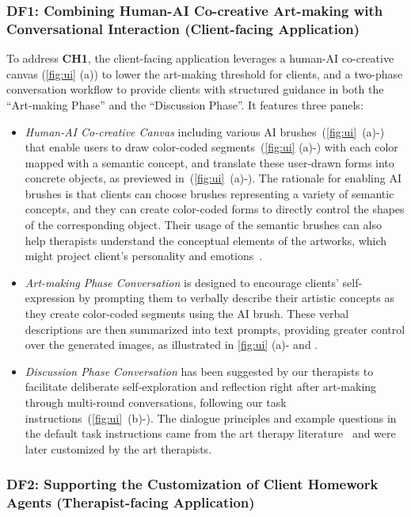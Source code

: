 \subsubsection{\textbf{DF1}: Combining Human-AI Co-creative Art-making with Conversational Interaction (Client-facing Application)}
To address \textbf{CH1}, the client-facing application leverages a human-AI co-creative canvas (\autoref{fig:ui} (a)) to lower the art-making threshold for clients, and a two-phase conversation workflow to provide clients with structured guidance in both the ``Art-making Phase'' and the ``Discussion Phase''. It features three panels: 
\begin{itemize}
    \item \textit{Human-AI Co-creative Canvas} including various AI brushes~(\autoref{fig:ui}~(a)-) that enable users to draw color-coded segments~(\autoref{fig:ui} (a)-) with each color mapped with a semantic concept, and translate these user-drawn forms into concrete objects, as previewed in~(\autoref{fig:ui}~(a)-). The rationale for enabling AI brushes is that clients can choose brushes representing a variety of semantic concepts, and they can create color-coded forms to directly control the shapes of the corresponding object. Their usage of the semantic brushes can also help therapists understand the conceptual elements of the artworks, which might project client's personality and emotions~\cite{malchiodi2007art}.
    \item \textit{Art-making Phase Conversation} is designed to encourage clients' self-expression by prompting them to verbally describe their artistic concepts as they create color-coded segments using the AI brush. These verbal descriptions are then summarized into text prompts, providing greater control over the generated images, as illustrated in \autoref{fig:ui} (a)- and .
    \item \textit{Discussion Phase Conversation} has been suggested by our therapists to facilitate deliberate self-exploration and reflection right after art-making through multi-round conversations, following our task instructions~(\autoref{fig:ui}~(b)-). The dialogue principles and example questions in the default task instructions came from the art therapy literature~\cite{buchalter2017250,buchalter2004practical,buchalter2009art} and were later customized by the art therapists.
\end{itemize}

\subsubsection{\textbf{DF2}: Supporting the Customization of Client Homework Agents (Therapist-facing Application)} 

